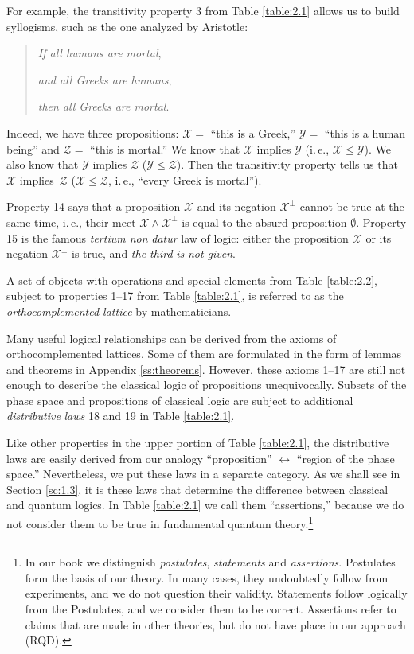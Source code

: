 \documentclass[nochecklpage]{stefan1}
\theoremstyle{definition}
\begin{document}
\nn
For example, the transitivity property 3 from Table \ref{table:2.1}
allows us to build syllogisms, such as the one analyzed by Aristotle:
%
\begin{quote}
\emph{If all humans are mortal},

\emph{and all Greeks are humans},

\emph{then all Greeks are mortal}.
\end{quote}
%
Indeed, we have three propositions: $ \mathcal{X} = $ ``this is a
Greek,'' $ \mathcal{Y} = $ ``this is a human being'' and $
\mathcal{Z} = $ ``this is mortal.'' We know that $ \mathcal{X}$ implies
$\mathcal{Y} $ (i.\,e., $ \mathcal{X} \leq \mathcal{Y} $). We also know
that $ \mathcal{Y} $ implies $ \mathcal{Z}$ ($ \mathcal{Y} \leq
\mathcal{Z} $). Then the transitivity property tells us that
$ \mathcal{X}$ implies~$ \mathcal{Z}$ ($ \mathcal{X} \leq \mathcal{Z}$,
i.\,e., ``every Greek is mortal'').

Property 14 says that a proposition $ \mathcal{X} $ and its negation
$ \mathcal{X}^{\perp } $ cannot be true at the same time, i.\,e., their
meet $ \mathcal{X} \wedge \mathcal{X}^{\perp } $ is equal to the absurd
proposition $\emptyset $. Property 15 is the famous \emph{tertium non}
\emph{datur} law of logic: either the proposition $ \mathcal{X} $ or its
negation $ \mathcal{X}^{\perp } $ is true, and \emph{the third} \emph{is}
\emph{not given}.

A set of objects with operations and special elements from Table
\ref{table:2.2}, subject to properties 1--17 from Table
\ref{table:2.1}, is referred to as the \emph{orthocomplemented
lattice} by mathematicians.

Many useful logical relationships can be derived from the axioms of
orthocomplemented lattices. Some of them are formulated in the form of
lemmas and theorems in Appendix \ref{ss:theorems}. However, these axioms
1--17 are still not enough to describe the classical logic of
propositions unequivocally. Subsets of the phase space and propositions
of classical logic are subject to additional \emph{distributive}
\emph{laws} 18 and 19 in Table \ref{table:2.1}.

Like other properties in the upper portion of Table \ref{table:2.1}, the
distributive laws are easily derived from our analogy ``proposition''
$\leftrightarrow $ ``region of the phase space.'' Nevertheless, we put
these laws in a separate category. As we shall see in Section
\ref{sc:1.3}, it is these laws that determine the difference between
classical and quantum logics. In Table \ref{table:2.1} we call them
``assertions,'' because we do not consider them to be true in
fundamental quantum theory.\footnote{In our book we distinguish
\emph{postulates}, \emph{statements} and \emph{assertions}.
Postulates form the basis of our theory. In many
cases, they undoubtedly follow from experiments, and we do not question
their validity. Statements follow logically from the Postulates, and we
consider them to be correct. Assertions refer to
claims that are made in other theories, but do not have place
in our approach (RQD).}
\end{document}
